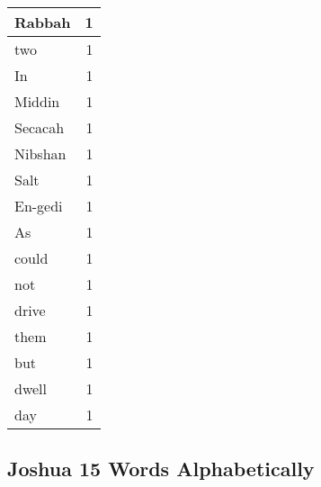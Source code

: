 \begin{center}
\begin{longtable}{l|r}
Rabbah & 1\\ \hline 
two & 1\\ \hline 
In & 1\\ \hline 
Middin & 1\\ \hline 
Secacah & 1\\ \hline 
Nibshan & 1\\ \hline 
Salt & 1\\ \hline 
En-gedi & 1\\ \hline 
As & 1\\ \hline 
could & 1\\ \hline 
not & 1\\ \hline 
drive & 1\\ \hline 
them & 1\\ \hline 
but & 1\\ \hline 
dwell & 1\\ \hline 
day & 1\\ \hline 
\end{longtable}
\end{center}





\subsection{Joshua 15 Words Alphabetically}


\normalsize
 
